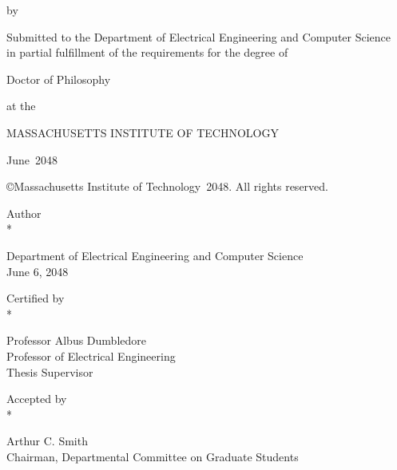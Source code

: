 
%
%

\renewcommand\DegreeName{Doctor of Philosophy}
\renewcommand\DepartmentName{Department of Electrical Engineering and Computer Science}
\renewcommand\SupervisorName{Professor Albus Dumbledore}
\renewcommand\DegreeDate{June 6, 2048}

%
%

\newcommand\DegreeMonth{June}
\newcommand\DegreeYear{2048}
\newcommand\SupervisorTitle{Professor of Electrical Engineering}
\newcommand\ChairmanName{Arthur C. Smith}
\newcommand\ChairmanTitle{Chairman, Departmental Committee on Graduate Students}

%
%

\def\signature#1#2{\par\noindent#1\dotfill\null\\*
  {\raggedleft #2\par}}


%
%


\begin{center}
    
    {\Large
    
    {\Huge \bfseries \TitleName \par}
    \vspace*{\baselineskip}
    by\par
    \vspace*{\baselineskip}
    {\huge \AuthorName \par}
    
    \vspace*{\baselineskip}
    Submitted to the \DepartmentName \\
    in partial fulfillment of the requirements for the degree of \par
    \vspace*{\baselineskip}
    {\huge \DegreeName \par}

    \vspace*{\baselineskip}
    at the \par
    {\Large MASSACHUSETTS INSTITUTE OF TECHNOLOGY \par}
    \DegreeMonth\ \DegreeYear \par
    
    \vspace*{\baselineskip}
    \copyright Massachusetts Institute of Technology\ \DegreeYear. All rights reserved. \par
    
    \null\vfill
    \signature{Author}{\DepartmentName \\ \DegreeDate}
    \par
    \vfill
    \signature{Certified by}{\SupervisorName \\ \SupervisorTitle \\ Thesis Supervisor}
    \par
    \vfill
    \signature{Accepted by}{\ChairmanName \\ \ChairmanTitle}
    
    }
           
\end{center}
